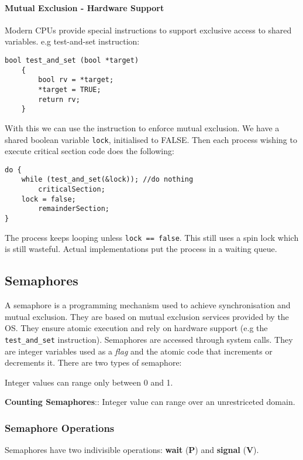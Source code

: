 \documentclass{article}%
\begin{document}
\paragraph{Mutual Exclusion - Hardware Support}
\label{sec:org3cf128a}
Modern CPUs provide special instructions to support exclusive access to shared variables.
e.g test-and-set instruction:
\begin{verbatim}
bool test_and_set (bool *target)
    {
        bool rv = *target;
        *target = TRUE;
        return rv;
    }
\end{verbatim}

With this we can use the instruction to enforce mutual exclusion.
We have a shared boolean variable \texttt{lock}, initialised to FALSE.
Then each process wishing to execute critical section code does the following:
\begin{verbatim}
do {
    while (test_and_set(&lock)); //do nothing
        criticalSection;
    lock = false;
        remainderSection;
}
\end{verbatim}
The process keeps looping unless \texttt{lock == false}.
This still uses a spin lock which is still wasteful.
Actual implementations put the process in a waiting queue.

\subsection{Semaphores}
\label{sec:org8d48254}
A semaphore is a programming mechanism used to achieve synchronisation and mutual exclusion.
They are based on mutual exclusion services provided by the OS.
They ensure atomic execution and rely on hardware support (e.g the \texttt{test\_and\_set} instruction).
Semaphores are accessed through system calls.
They are integer variables used as a \emph{flag} and the atomic code that increments or decrements it.
There are two types of semaphore:
\begin{description}
\item[{\textbf{Binary Semaphores} (mutex)}] Integer values can range only between 0 and 1.
\item \textbf{Counting Semaphores}:: Integer value can range over an unrestriceted domain.
\end{description}

\subsubsection{Semaphore Operations}
\label{sec:org347484f}
Semaphores have two indivisible operations: \textbf{wait} (\textbf{P}) and \textbf{signal} (\textbf{V}).
\end{document}
